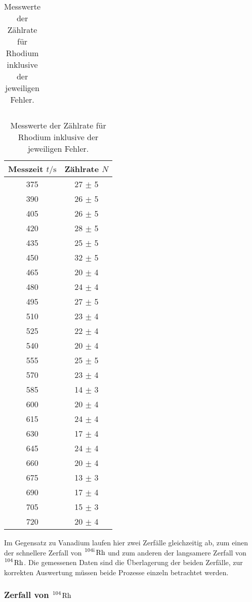 \begin{table} [H]
\begin{tabular}{c c}
      \bottomrule
    \end{tabular}
    \begin{tabular}{c c}
      \toprule
      Messzeit $t/\unit{\second}$ & Zählrate $N$\\
      \midrule
      375 &  27 $\pm$ 5 \\
      390 & 26 $\pm$ 5 \\
      405 & 26 $\pm$ 5 \\
      420 & 28 $\pm$ 5 \\
      435 & 25 $\pm$ 5 \\
      450 & 32 $\pm$ 5 \\
      465 & 20 $\pm$ 4 \\
      480 & 24 $\pm$ 4 \\
      495 & 27 $\pm$ 5 \\
      510 & 23 $\pm$ 4 \\
      525 & 22 $\pm$ 4 \\
      540 & 20 $\pm$ 4 \\
      555 & 25 $\pm$ 5 \\
      570 & 23 $\pm$ 4 \\
      585 & 14 $\pm$ 3 \\
      600 & 20 $\pm$ 4 \\
      615 & 24 $\pm$ 4 \\
      630 & 17 $\pm$ 4 \\
      645 & 24 $\pm$ 4 \\
      660 & 20 $\pm$ 4 \\
      675 & 13 $\pm$ 3 \\
      690 & 17 $\pm$ 4 \\
      705 & 15 $\pm$ 3 \\
      720 & 20 $\pm$ 4 \\
      \bottomrule
    \end{tabular}
    \caption{Messwerte der Zählrate für Rhodium inklusive der jeweiligen Fehler.}
    \label{tab:Rh}
\end{table}

Im Gegensatz zu Vanadium laufen hier zwei Zerfälle gleichzeitig ab, zum einen der schnellere Zerfall von
$\ce{^{104\text{i}} Rh}$ und zum anderen der langsamere Zerfall von $\ce{^104 Rh}$.
Die gemessenen Daten sind die Überlagerung der beiden Zerfälle, zur korrekten Auswertung müssen beide
Prozesse einzeln betrachtet werden.

\subsubsection{Zerfall von $\ce{^104 Rh}$}

